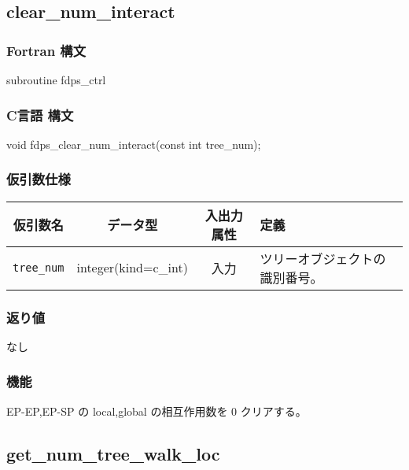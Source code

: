 \subsection{clear\_num\_interact}
\subsubsection*{Fortran 構文}
\begin{screen}
\begin{spverbatim}
subroutine fdps_ctrl%
\end{spverbatim}
\end{screen}

\subsubsection*{C言語 構文}
\begin{screen}
\begin{spverbatim}
void fdps_clear_num_interact(const int tree_num);
\end{spverbatim}
\end{screen}


\subsubsection*{仮引数仕様}
\begin{table}[h]
\begin{tabularx}{\linewidth}{cccX}
\toprule
\rowcolor{Snow2}
仮引数名 & データ型 & 入出力属性 & 定義 \\
\midrule
\verb|tree_num|  & integer(kind=c\_int)   & 入力     & ツリーオブジェクトの識別番号。\\
\bottomrule
\end{tabularx}
\end{table}

\subsubsection*{返り値}
なし

\subsubsection*{機能}
EP-EP,EP-SP の local,global の相互作用数を 0 クリアする。
\clearpage

\subsection{get\_num\_tree\_walk\_loc}
